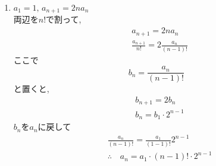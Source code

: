     \noindent{}
    \begin{enumerate}[label=(\arabic*),parsep=3pt,format=\bookitemlink{example-ratio-1}{solution}{problem}]
      \item $\displaystyle a_1=1,\, a_{n+1}=2na_n$\\
            両辺を$n!$で割って,
            \begin{align*}
              &a_{n+1}=2na_n\\
              &\frac{a_{n+1}}{n!}=2\frac{a_n}{(n-1)!}
            \end{align*}
            ここで
            \[
              b_n=\frac{a_n}{(n-1)!}
            \]
            と置くと,
            \begin{align*} 
              &b_{n+1}=2b_n\\
              &b_n=b_1\cdot 2^{n-1}
            \end{align*}
            $b_n$を$a_n$に戻して
            \begin{align*} 
              &\frac{a_n}{(n-1)!}=\frac{a_1}{(1-1)!}2^{n-1}\\
              &\therefore \quad a_n=a_1 \cdot (n-1)! \cdot 2^{n-1}
            \end{align*}
            

\end{enumerate}
